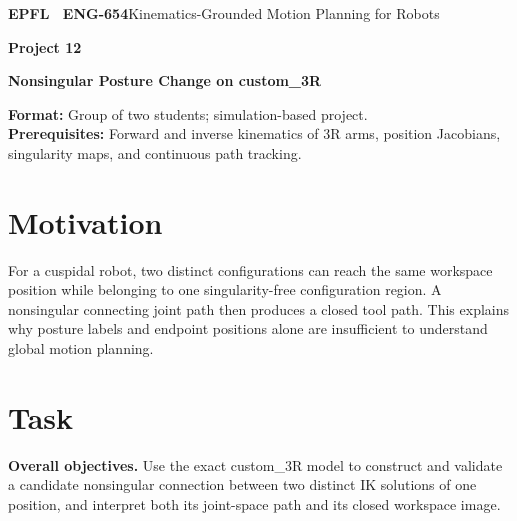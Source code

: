 \documentclass[11pt,a4paper]{article}
\begin{document}
{\small\textbf{EPFL \textbar\ ENG-654}\hfill Kinematics-Grounded Motion Planning for Robots}
\vspace{5mm}

{\color{epflred}\Large\bfseries Project 12}

{\LARGE\bfseries Nonsingular Posture Change on custom\_3R\par}

\textbf{Format:} Group of two students; simulation-based project.\\
\textbf{Prerequisites:} Forward and inverse kinematics of 3R arms, position Jacobians, singularity maps, and continuous path tracking.

\section*{Motivation}
For a cuspidal robot, two distinct configurations can reach the same
workspace position while belonging to one singularity-free configuration
region. A nonsingular connecting joint path then produces a closed tool path.
This explains why posture labels and endpoint positions alone are insufficient
to understand global motion planning.

\section*{Task}
\textbf{Overall objectives.} Use the exact custom\_3R model to construct and validate a candidate
nonsingular connection between two distinct IK solutions of one position,
and interpret both its joint-space path and its closed workspace image.
\end{document}

